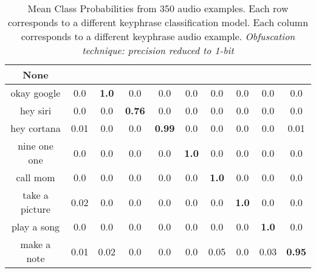 \begin{table}[!th]
\begin{tabular}{cccccccccc}%
\hline%
None&\rotate{random talk}{70}&\rotate{okay google}{70}&\rotate{hey siri}{70}&\rotate{hey cortana}{70}&\rotate{nine one one}{70}&\rotate{call mom}{70}&\rotate{take a picture}{70}&\rotate{play a song}{70}&\rotate{make a note}{70}\\%
\hline%
okay google&0.0&\textbf{1.0}&0.0&0.0&0.0&0.0&0.0&0.0&0.0\\%
hey siri&0.0&0.0&\textbf{0.76}&0.0&0.0&0.0&0.0&0.0&0.0\\%
hey cortana&0.01&0.0&0.0&\textbf{0.99}&0.0&0.0&0.0&0.0&0.01\\%
nine one one&0.0&0.0&0.0&0.0&\textbf{1.0}&0.0&0.0&0.0&0.0\\%
call mom&0.0&0.0&0.0&0.0&0.0&\textbf{1.0}&0.0&0.0&0.0\\%
take a picture&0.02&0.0&0.0&0.0&0.0&0.0&\textbf{1.0}&0.0&0.0\\%
play a song&0.0&0.0&0.0&0.0&0.0&0.0&0.0&\textbf{1.0}&0.0\\%
make a note&0.01&0.02&0.0&0.0&0.0&0.05&0.0&0.03&\textbf{0.95}\\%
\hline%
\end{tabular}
\caption{Mean Class Probabilities from 350 audio examples. Each row corresponds to a different keyphrase classification model. Each column corresponds to a different keyphrase audio example. \emph{Obfuscation technique: precision reduced to 1-bit}}
\label{tab:probs_precision_1_hamming_1}
\end{table}











